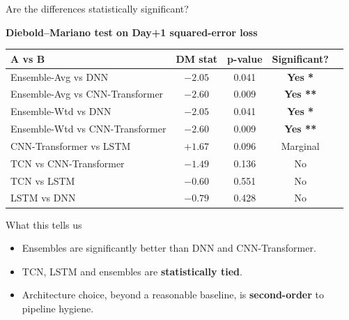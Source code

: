 \documentclass[aspectratio=169]{beamer}
\begin{document}
\begin{frame}{Are the differences statistically significant?}
\footnotesize
\begin{center}
\textbf{Diebold--Mariano test on Day+1 squared-error loss}
\\[0.2cm]
\begin{tabular}{lcccc}
\toprule
\textbf{A} vs \textbf{B} & \textbf{DM stat} & \textbf{p-value} & \textbf{Significant?} \\
\midrule
Ensemble-Avg vs DNN                & $-2.05$ & 0.041 & \textcolor{accentgreen}{\textbf{Yes *}} \\
Ensemble-Avg vs CNN-Transformer    & $-2.60$ & 0.009 & \textcolor{accentgreen}{\textbf{Yes **}} \\
Ensemble-Wtd vs DNN                & $-2.05$ & 0.041 & \textcolor{accentgreen}{\textbf{Yes *}} \\
Ensemble-Wtd vs CNN-Transformer    & $-2.60$ & 0.009 & \textcolor{accentgreen}{\textbf{Yes **}} \\
CNN-Transformer vs LSTM            & $+1.67$ & 0.096 & Marginal \\
TCN vs CNN-Transformer             & $-1.49$ & 0.136 & No \\
TCN vs LSTM                        & $-0.60$ & 0.551 & No \\
LSTM vs DNN                        & $-0.79$ & 0.428 & No \\
\bottomrule
\end{tabular}
\end{center}

\vspace{0.3cm}
\begin{block}{What this tells us}
\begin{itemize}\small
  \item Ensembles are significantly better than DNN and CNN-Transformer.
  \item TCN, LSTM and ensembles are \textbf{statistically tied}.
  \item Architecture choice, beyond a reasonable baseline, is \textbf{second-order} to pipeline hygiene.
\end{itemize}
\end{block}
\end{frame}
\end{document}
